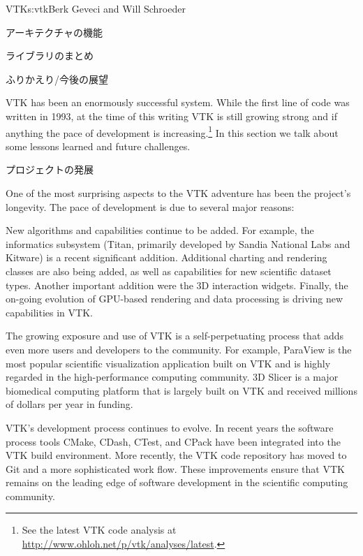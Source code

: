 \begin{aosachapter}{VTK}{s:vtk}{Berk Geveci and Will Schroeder}
\begin{aosasect1}{アーキテクチャの機能}
\begin{aosasect2}{ライブラリのまとめ}
\end{aosasect2}

\end{aosasect1}

\begin{aosasect1}{ふりかえり/今後の展望}

VTK has been an enormously successful system. While the first line of code was written in
1993, at the time of this writing VTK is still growing strong and if anything
the pace of development is increasing.\footnote{See the latest VTK code
analysis at \url{http://www.ohloh.net/p/vtk/analyses/latest}.} In this section
we talk about some lessons learned and future challenges.

\begin{aosasect2}{プロジェクトの発展}

One of the most surprising aspects to the VTK adventure has been the
project's longevity. The pace of development is due to several major
reasons:

\begin{aosaitemize}

  \item New algorithms and capabilities continue to be added. For
  example, the informatics subsystem (Titan, primarily developed by
  Sandia National Labs and Kitware) is a recent significant
  addition. Additional charting and rendering classes are also being
  added, as well as capabilities for new scientific dataset
  types. Another important addition were the 3D interaction
  widgets. Finally, the on-going evolution of GPU-based rendering and
  data processing is driving new capabilities in VTK.

  \item The growing exposure and use of VTK is a self-perpetuating
  process that adds even more users and developers to the
  community. For example, ParaView is the most popular scientific
  visualization application built on VTK and is highly regarded in the
  high-performance computing community. 3D Slicer is a major
  biomedical computing platform that is largely built on VTK and
  received millions of dollars per year in funding.

  \item VTK's development process continues to evolve. In recent years
  the software process tools CMake, CDash, CTest, and CPack have been
  integrated into the VTK build environment. More recently, the VTK
  code repository has moved to Git and a more sophisticated work
  flow. These improvements ensure that VTK remains on the leading edge
  of software development in the scientific computing community.


\end{aosaitemize}
\end{aosasect2}
\end{aosasect1}
\end{aosachapter}
